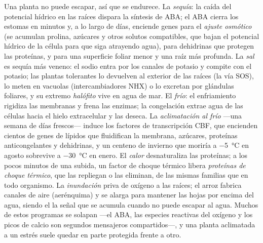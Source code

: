 \begin{definition}\label{def:b3:plant-molecular-physiology:abiotic}
Una planta no puede escapar, así que se endurece. La \emph{sequía}: la
caída del potencial hídrico en las raíces dispara la síntesis de ABA;
el ABA cierra los estomas en minutos y, a lo largo de días, enciende
genes para el \emph{ajuste osmótico} (se acumulan prolina, azúcares y
otros solutos compatibles, que bajan el potencial hídrico de la célula
para que siga atrayendo agua), para dehidrinas que protegen las
proteínas, y para una superficie foliar menor y una raíz más profunda.
La \emph{sal} es sequía más veneno: el sodio entra por los canales de
potasio y compite con el potasio; las plantas tolerantes lo devuelven
al exterior de las raíces (la vía SOS), lo meten en vacuolas
(intercambiadores NHX) o lo excretan por glándulas foliares, y su
extremo \emph{halófito} vive en agua de mar. El \emph{frío}: el
enfriamiento rigidiza las membranas y frena las enzimas; la congelación
extrae agua de las células hacia el hielo extracelular y las deseca. La
\emph{aclimatación al frío} ---una semana de días frescos--- induce los
factores de transcripción CBF, que encienden cientos de genes de
lípidos que fluidifican la membrana, azúcares, proteínas anticongelantes
y dehidrinas, y un centeno de invierno que moriría a
\qty{-5}{\celsius} en agosto sobrevive a \qty{-30}{\celsius} en enero.
El \emph{calor} desnaturaliza las proteínas; a los pocos minutos de una
subida, un factor de choque térmico libera \emph{proteínas de choque
térmico},  que las repliegan o las eliminan, de las mismas
familias que en todo organismo. La \emph{inundación} priva de oxígeno a
las raíces; el arroz fabrica canales de aire (aerénquima) y se alarga
para mantener las hojas por encima del agua, siendo el  la señal
que se acumula cuando no puede escapar al agua. Muchos de estos
programas se solapan ---el ABA, las especies reactivas del oxígeno y
los picos de calcio son segundos mensajeros compartidos---, y una
planta aclimatada a un estrés suele quedar en parte protegida frente a
otro.
\end{definition}

